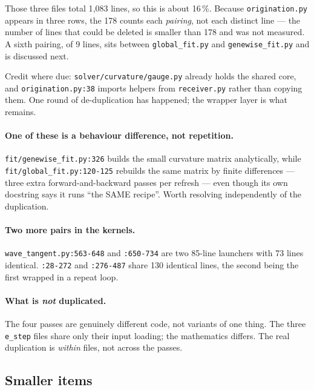 \documentclass[11pt]{article}
\newcommand{\loc}[1]{\nolinkurl{#1}}
\newcommand{\dir}[1]{\nolinkurl{#1}}
\begin{document}
Those three files total 1{,}083 lines, so this is about 16\,\%.  Because
\dir{origination.py} appears in three rows, the 178 counts each \emph{pairing},
not each distinct line --- the number of lines that could be deleted is smaller
than 178 and was not measured.  A sixth pairing, of 9 lines, sits between
\dir{global\_fit.py} and \dir{genewise\_fit.py} and is discussed next.

Credit where due: \dir{solver/curvature/gauge.py} already holds the shared core,
and \loc{origination.py:38} imports helpers from \dir{receiver.py} rather than
copying them.  One round of de-duplication has happened; the wrapper layer is
what remains.

\paragraph{One of these is a behaviour difference, not repetition.}
\loc{fit/genewise\_fit.py:326} builds the small curvature matrix analytically,
while \loc{fit/global\_fit.py:120-125} rebuilds the same matrix by finite
differences --- three extra forward-and-backward passes per refresh --- even
though its own docstring says it runs ``the SAME recipe''.  Worth resolving
independently of the duplication.

\paragraph{Two more pairs in the kernels.}
\loc{wave\_tangent.py:563-648} and \loc{:650-734} are two 85-line launchers with
73 lines identical.  \loc{:28-272} and \loc{:276-487} share 130 identical lines,
the second being the first wrapped in a repeat loop.

\paragraph{What is \emph{not} duplicated.}  The four passes are genuinely
different code, not variants of one thing.  The three \texttt{e\_step} files
share only their input loading; the mathematics differs.  The real duplication
is \emph{within} files, not across the passes.

\subsection{Smaller items}
\end{document}
